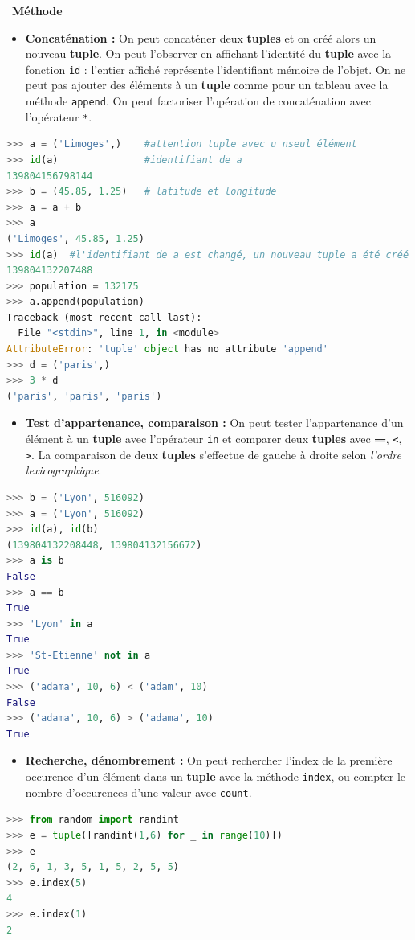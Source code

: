 \documentclass[
  11pt,
]{article}
\newcommand{\passthrough}[1]{#1}
\providecommand{\tightlist}{%
  \setlength{\itemsep}{0pt}\setlength{\parskip}{0pt}}
\newenvironment{methode}[1]
{\par \medskip    \noindent  
 \begin {bclogo}[arrondi =0.1,logo=\bcoutil, marge=4,noborder = true] {~\textbf{Méthode}   {\itshape #1} }  \par}
{
\end{bclogo}
 \par \bigskip }
\begin{document}
\begin{methode}{}
\begin{itemize}
\tightlist
\item
  \textbf{Concaténation :} On peut concaténer deux \textbf{tuples} et on
  créé alors un nouveau \textbf{tuple}. On peut l'observer en affichant
  l'identité du \textbf{tuple} avec la fonction
  \passthrough{\lstinline!id!} : l'entier affiché représente
  l'identifiant mémoire de l'objet. On ne peut pas ajouter des éléments
  à un \textbf{tuple} comme pour un tableau avec la méthode
  \passthrough{\lstinline!append!}. On peut factoriser l'opération de
  concaténation avec l'opérateur \passthrough{\lstinline!*!}.
\end{itemize}

\begin{lstlisting}[language=Python]
>>> a = ('Limoges',)    #attention tuple avec u nseul élément
>>> id(a)               #identifiant de a 
139804156798144
>>> b = (45.85, 1.25)   # latitude et longitude
>>> a = a + b
>>> a
('Limoges', 45.85, 1.25)
>>> id(a)  #l'identifiant de a est changé, un nouveau tuple a été créé
139804132207488
>>> population = 132175
>>> a.append(population)
Traceback (most recent call last):
  File "<stdin>", line 1, in <module>
AttributeError: 'tuple' object has no attribute 'append'
>>> d = ('paris',)
>>> 3 * d
('paris', 'paris', 'paris')
\end{lstlisting}

\begin{itemize}
\tightlist
\item
  \textbf{Test d'appartenance, comparaison :} On peut tester
  l'appartenance d'un élément à un \textbf{tuple} avec l'opérateur
  \passthrough{\lstinline!in!} et comparer deux \textbf{tuples} avec
  \passthrough{\lstinline!==!}, \passthrough{\lstinline!<!},
  \passthrough{\lstinline!>!}. La comparaison de deux \textbf{tuples}
  s'effectue de gauche à droite selon \emph{l'ordre lexicographique}.
\end{itemize}

\begin{lstlisting}[language=Python]
>>> b = ('Lyon', 516092)
>>> a = ('Lyon', 516092)
>>> id(a), id(b)
(139804132208448, 139804132156672)
>>> a is b
False
>>> a == b
True
>>> 'Lyon' in a
True
>>> 'St-Etienne' not in a
True
>>> ('adama', 10, 6) < ('adam', 10)
False
>>> ('adama', 10, 6) > ('adama', 10)
True
\end{lstlisting}

\begin{itemize}
\tightlist
\item
  \textbf{Recherche, dénombrement :} On peut rechercher l'index de la
  première occurence d'un élément dans un \textbf{tuple} avec la méthode
  \passthrough{\lstinline!index!}, ou compter le nombre d'occurences
  d'une valeur avec \passthrough{\lstinline!count!}.
\end{itemize}

\begin{lstlisting}[language=Python]
>>> from random import randint
>>> e = tuple([randint(1,6) for _ in range(10)])
>>> e
(2, 6, 1, 3, 5, 1, 5, 2, 5, 5)
>>> e.index(5)
4
>>> e.index(1)
2
\end{lstlisting}

\end{methode}
\end{document}

